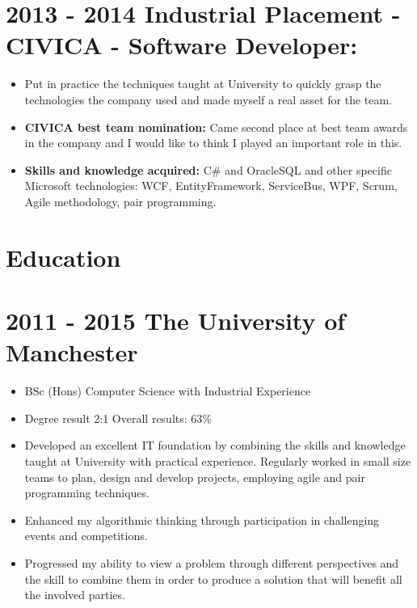 \documentclass[12pt,a4paper]{res}
\begin{document}
\begin{resume}
\section{\bf 2013 - 2014 \hspace{0.5mm} Industrial Placement - CIVICA - Software Developer:}
\vspace{5mm}    
	\begin{itemize}
	\item[] Put in practice the techniques taught at University to quickly grasp the technologies the company used and made myself a real asset for the team.
	\item{\bf CIVICA best team nomination:} Came second place at best team awards in the company and I would like to think I played an important role in this.
	\item{\bf Skills and knowledge acquired:} C\# and OracleSQL and other specific Microsoft technologies: WCF, EntityFramework, ServiceBus, WPF, Scrum, Agile methodology, pair programming.
	\end{itemize}


\section{\large\bf Education}
\vspace{5mm}

\section{\bf 2011 - 2015 \hspace{1.5mm}The University of Manchester}
  
  \begin{itemize} %
     \item[] BSc (Hons) Computer Science  with Industrial Experience
     \item[] Degree result 2:1 \hspace{10mm}Overall results: 63\% 

     \item Developed an excellent IT foundation by combining the skills and knowledge taught at University with practical experience. Regularly worked in small size teams to plan, design and develop projects,   employing agile and pair programming techniques.
     \item Enhanced my algorithmic thinking through participation in challenging events and competitions.
     \item Progressed my ability to view a problem through different perspectives and the skill to combine them in order to produce a solution that will benefit all the involved parties.
   \end{itemize}


\end{resume}
\end{document}
